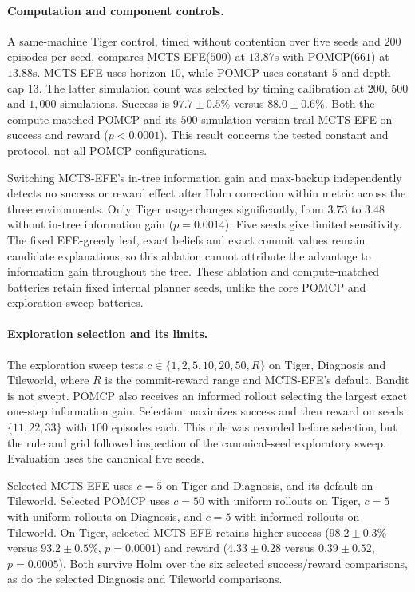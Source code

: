 \documentclass[manuscript, screen, review]{jair}
\begin{document}
\paragraph{Computation and component controls.}
A same-machine Tiger control, timed without contention over five seeds and $200$ episodes per seed, compares MCTS-EFE($500$) at $13.87$s with POMCP($661$) at $13.88$s. MCTS-EFE uses horizon $10$, while POMCP uses constant $5$ and depth cap $13$. The latter simulation count was selected by timing calibration at $200$, $500$ and $1{,}000$ simulations. Success is $97.7\pm0.5\%$ versus $88.0\pm0.6\%$. Both the compute-matched POMCP and its $500$-simulation version trail MCTS-EFE on success and reward ($p<0.0001$). This result concerns the tested constant and protocol, not all POMCP configurations.

Switching MCTS-EFE's in-tree information gain and max-backup independently detects no success or reward effect after Holm correction within metric across the three environments. Only Tiger usage changes significantly, from $3.73$ to $3.48$ without in-tree information gain ($p=0.0014$). Five seeds give limited sensitivity. The fixed EFE-greedy leaf, exact beliefs and exact commit values remain candidate explanations, so this ablation cannot attribute the advantage to information gain throughout the tree. These ablation and compute-matched batteries retain fixed internal planner seeds, unlike the core POMCP and exploration-sweep batteries.

\paragraph{Exploration selection and its limits.}
The exploration sweep tests $c\in\{1,2,5,10,\allowbreak 20,50,R\}$ on Tiger, Diagnosis and Tileworld, where $R$ is the commit-reward range and MCTS-EFE's default. Bandit is not swept. POMCP also receives an informed rollout selecting the largest exact one-step information gain. Selection maximizes success and then reward on seeds $\{11,22,33\}$ with $100$ episodes each. This rule was recorded before selection, but the rule and grid followed inspection of the canonical-seed exploratory sweep. Evaluation uses the canonical five seeds.

Selected MCTS-EFE uses $c=5$ on Tiger and Diagnosis, and its default on Tileworld. Selected POMCP uses $c=50$ with uniform rollouts on Tiger, $c=5$ with uniform rollouts on Diagnosis, and $c=5$ with informed rollouts on Tileworld. On Tiger, selected MCTS-EFE retains higher success ($98.2\pm0.3\%$ versus $93.2\pm0.5\%$, $p=0.0001$) and reward ($4.33\pm0.28$ versus $0.39\pm0.52$, $p=0.0005$). Both survive Holm over the six selected success/reward comparisons, as do the selected Diagnosis and Tileworld comparisons.
\end{document}
